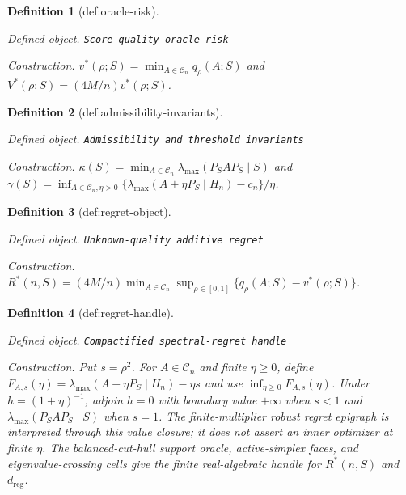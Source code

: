 \documentclass{article}
\newtheorem{definition}{Definition}
\begin{document}
\begin{definition}[def:oracle-risk]\label{def:oracle-risk}
\par\smallskip\noindent\emph{Defined object.} \texttt{Score-\allowbreak{}quality oracle risk}
\par\smallskip\noindent\emph{Construction.} \(v^*(\rho;S)=\min_{A\in\mathcal C_n}q_\rho(A;S)\) and \(V^*(\rho;S)=(4M/n)v^*(\rho;S)\).
\end{definition}

\begin{definition}[def:admissibility-invariants]\label{def:admissibility-invariants}
\par\smallskip\noindent\emph{Defined object.} \texttt{Admissibility and threshold invariants}
\par\smallskip\noindent\emph{Construction.} \(\kappa(S)=\min_{A\in\mathcal C_n}\lambda_{\max}(P_SAP_S\mid S)\) and \(\gamma(S)=\inf_{A\in\mathcal C_n,\eta>0}\{\lambda_{\max}(A+\eta P_S\mid H_n)-c_n\}/\eta\).
\end{definition}

\begin{definition}[def:regret-object]\label{def:regret-object}
\par\smallskip\noindent\emph{Defined object.} \texttt{Unknown-\allowbreak{}quality additive regret}
\par\smallskip\noindent\emph{Construction.} \(R^*(n,S)=(4M/n)\min_{A\in\mathcal C_n}\sup_{\rho\in[0,1]}\{q_\rho(A;S)-v^*(\rho;S)\}\).
\end{definition}

\begin{definition}[def:regret-handle]\label{def:regret-handle}
\par\smallskip\noindent\emph{Defined object.} \texttt{Compactified spectral-\allowbreak{}regret handle}
\par\smallskip\noindent\emph{Construction.} Put \(s=\rho^2\). For \(A\in\mathcal C_n\) and finite \(\eta\geq0\), define \(F_{A,s}(\eta)=\lambda_{\max}(A+\eta P_S\mid H_n)-\eta s\) and use \(\inf_{\eta\geq0}F_{A,s}(\eta)\). Under \(h=(1+\eta)^{-1}\), adjoin \(h=0\) with boundary value \(+\infty\) when \(s<1\) and \(\lambda_{\max}(P_SAP_S\mid S)\) when \(s=1\). The finite-multiplier robust regret epigraph is interpreted through this value closure; it does not assert an inner optimizer at finite \(\eta\). The balanced-cut-hull support oracle, active-simplex faces, and eigenvalue-crossing cells give the finite real-algebraic handle for \(R^*(n,S)\) and \(d_{\mathrm{reg}}\).
\end{definition}
\end{document}
